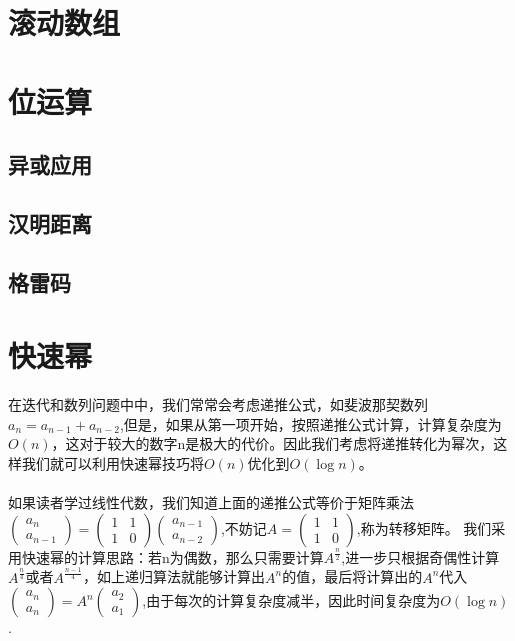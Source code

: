 \documentclass[12pt,a4paper,UTF16]{ctexbook}
\theoremstyle{plain}
\begin{document}
\section{滚动数组}
\section{位运算}
\subsection{异或应用}
\subsection{汉明距离}
\subsection{格雷码}
\section{快速幂}
\paragraph{}在迭代和数列问题中中，我们常常会考虑递推公式，如斐波那契数列$a_n=a_{n-1}+a_{n-2}$,但是，如果从第一项开始，按照递推公式计算，计算复杂度为$O(n)$，这对于较大的数字n是极大的代价。因此我们考虑将递推转化为幂次，这样我们就可以利用快速幂技巧将$O(n)$优化到$O(\log n)$。
\paragraph{}如果读者学过线性代数，我们知道上面的递推公式等价于矩阵乘法$\begin{pmatrix}a_n\\a_{n-1}\end{pmatrix}=\begin{pmatrix}1&1\\1&0\end{pmatrix}\begin{pmatrix}a_{n-1}\\a_{n-2}\end{pmatrix}$,不妨记$A=\begin{pmatrix}1&1\\1&0\end{pmatrix}$,称为转移矩阵。
我们采用快速幂的计算思路：若n为偶数，那么只需要计算$A^{\frac{n}{2}}$,进一步只根据奇偶性计算$A^{\frac{n}{4}}$或者$A^{\frac{n-1}{4}}$，如上递归算法就能够计算出$A^n$的值，最后将计算出的$A^n$代入$\begin{pmatrix}a_n\\a_{n}\end{pmatrix}=A^n\begin{pmatrix}a_{2}\\a_{1}\end{pmatrix}$,由于每次的计算复杂度减半，因此时间复杂度为$O(\log n)$.
\end{document}
